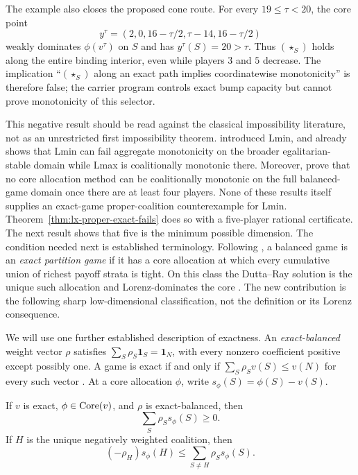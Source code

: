 The example also closes the proposed cone route.  For every
$19\leq\tau<20$, the core point
\[
 y^\tau=(2,0,16-\tau/2,\tau-14,16-\tau/2)
\]
weakly dominates $\phi(v^\tau)$ on $S$ and has $y^\tau(S)=20>\tau$.
Thus $(\star_S)$ holds along the entire binding interior, even while players
$3$ and $5$ decrease.  The implication ``$(\star_S)$ along an exact path
implies coordinatewise monotonicity'' is therefore false; the carrier
program controls exact bump capacity but cannot prove monotonicity of this
selector.

This negative result should be read against the classical impossibility
literature, not as an unrestricted first impossibility theorem.
\citet{ArinInarra2001} introduced Lmin, and \citet{Dietzenbacher2021}
already shows that Lmin can fail aggregate monotonicity on the broader
egalitarian-stable domain while Lmax is coalitionally monotonic there.
Moreover, \citet{HousmanClark1998} prove that no core allocation method can
be coalitionally monotonic on the full balanced-game domain once there are at
least four players.  None of these results itself supplies an exact-game
proper-coalition counterexample for Lmin.  Theorem~\ref{thm:lx-proper-exact-fails}
does so with a five-player rational certificate.  The next result shows that
five is the minimum possible dimension.
The condition needed next is established terminology.  Following
\citet{LlerenaMauri2017}, a balanced game is an \emph{exact partition game} if
it has a core allocation at which every cumulative union of richest payoff
strata is tight.  On this class the Dutta--Ray solution is the unique such
allocation and Lorenz-dominates the core
\citep{LlerenaMauri2017,DietzenbacherYanovskaya2020}.  The new contribution is
the following sharp low-dimensional classification, not the definition or its
Lorenz consequence.

We will use one further established description of exactness.  An
\emph{exact-balanced} weight vector $\rho$ satisfies
$\sum_S\rho_S\mathbf1_S=\mathbf1_N$, with every nonzero coefficient positive
except possibly one.  A game is exact if and only if
$\sum_S\rho_Sv(S)\leq v(N)$ for every such vector
\citep{CsokaHeringsKoczy2011,LohmannBormHerings2012}.  At a core allocation
$\phi$, write $s_\phi(S)=\phi(S)-v(S)$.

\begin{lemma}
\label{lem:lx-exact-balanced-slack}
If $v$ is exact, $\phi\in\operatorname{Core}(v)$, and $\rho$ is exact-balanced, then
\[
 \sum_S\rho_Ss_\phi(S)\geq0.                          \tag{SB}
 \label{eq:lx-slack-budget}
\]
If $H$ is the unique negatively weighted coalition, then
\[
 (-\rho_H)s_\phi(H)\leq
 \sum_{S\ne H}\rho_Ss_\phi(S).                       \tag{SB-H}
\]
\end{lemma}

